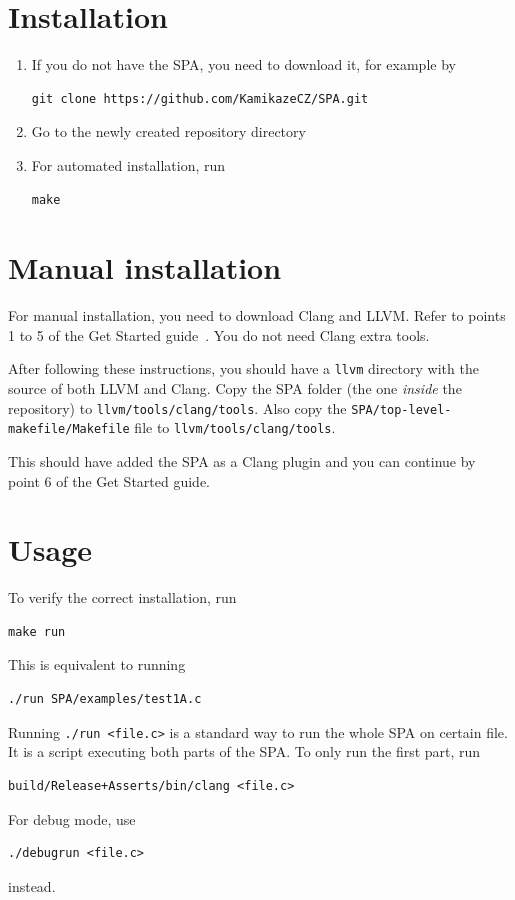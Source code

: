 \section{Installation}
\begin{enumerate}
\item If you do not have the SPA, you need to download it, for example by
\begin{verbatim}git clone https://github.com/KamikazeCZ/SPA.git\end{verbatim}

\item Go to the newly created repository directory

\item For automated installation, run
\begin{verbatim}make\end{verbatim}
\end{enumerate}
\section{Manual installation}
For manual installation, you need to download Clang and LLVM. Refer to points 1 to 5 of the Get Started guide~\cite{clang-get_started}. You do not need Clang extra tools.

After following these instructions, you should have a \verb|llvm| directory with the source of both LLVM and Clang. Copy the SPA folder (the one \emph{inside} the repository) to \verb|llvm/tools/clang/tools|. Also copy the \verb|SPA/top-level-makefile/Makefile| file to \verb|llvm/tools/clang/tools|.

This should have added the SPA as a Clang plugin and you can continue by point 6 of the Get Started guide.
\section{Usage}
To verify the correct installation, run \begin{verbatim}make run\end{verbatim} This is equivalent to running \begin{verbatim}./run SPA/examples/test1A.c\end{verbatim}

Running \verb|./run <file.c>| is a standard way to run the whole SPA on certain file. It is a script executing both parts of the SPA. To only run the first part, run \begin{verbatim}build/Release+Asserts/bin/clang <file.c>\end{verbatim}
For debug mode, use \begin{verbatim}./debugrun <file.c>\end{verbatim} instead.

